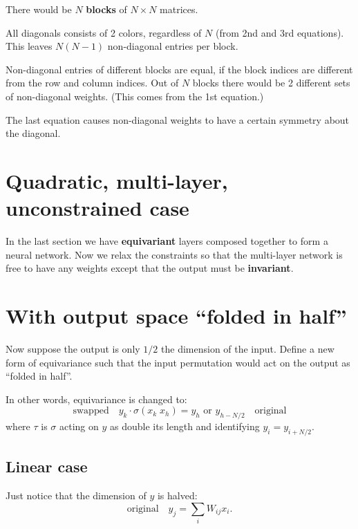 There would be $N$ \textbf{blocks} of $N \times N$ matrices.

All diagonals consists of 2 colors, regardless of $N$ (from 2nd and 3rd equations).  This leaves $N (N - 1)$ non-diagonal entries per block.

Non-diagonal entries of different blocks are equal, if the block indices are different from the row and column indices.  Out of $N$ blocks there would be 2 different sets of non-diagonal weights.  (This comes from the 1st equation.)

The last equation causes non-diagonal weights to have a certain symmetry about the diagonal.  

\section{Quadratic, multi-layer, unconstrained case}

In the last section we have \textbf{equivariant} layers composed together to form a neural network.  Now we relax the constraints so that the multi-layer network is free to have any weights except that the output must be \textbf{invariant}.




\section{With output space ``folded in half''}

Now suppose the output is only $1/2$ the dimension of the input.  Define a new form of equivariance such that the input permutation would act on the output as ``folded in half''. 

In other words, equivariance is changed to:
\begin{equation}
\boxed{\mbox{swapped}} \quad y_k \cdot \sigma(x_k \; x_h) = y_h \mbox{  or  } y_{h-N/2} \quad \boxed{\mbox{original}} \end{equation}
where $\tau$ is $\sigma$ acting on $y$ as double its length and identifying $y_i = y_{i + N/2}$.

\subsection{Linear case}

Just notice that the dimension of $y$ is halved:
\begin{equation}
\boxed{\mbox{original}} \quad y_j = \sum_i W_{ij} x_i .
\end{equation}

